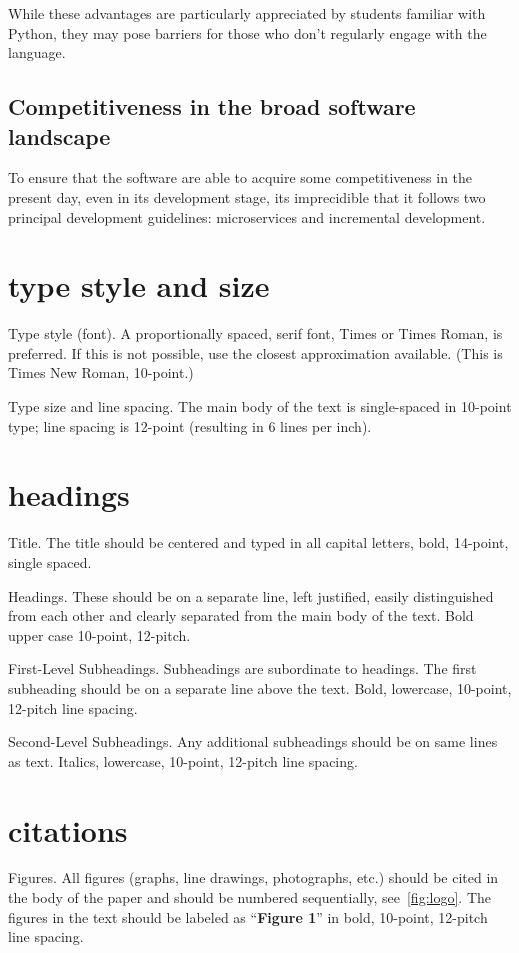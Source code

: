 \documentclass[10pt,twocolumn,twoside]{article}
\begin{document}
While these advantages are particularly appreciated by students familiar with Python, they may pose barriers for those who don't regularly engage with the language.

\subsection{Competitiveness in the broad software landscape}

To ensure that the software are able to acquire some competitiveness in the present day, even in its development stage, its imprecidible that it follows two principal development guidelines: microservices and incremental development.

\section{type style and size}
Type style (font). A proportionally spaced, serif font, Times or Times Roman, is preferred. If this is not possible, use the closest approximation available. (This is Times New Roman, 10-point.)

Type size and line spacing. The main body of the text is single-spaced in 10-point type; line spacing is 12-point (resulting in 6 lines per inch).

\section{headings}

Title. The title should be centered and typed in all capital letters, bold, 14-point, single spaced.

Headings. These should be on a separate line, left justified, easily distinguished from each other and clearly separated from the main body of the text. Bold upper case 10-point, 12-pitch.

First-Level Subheadings. Subheadings are subordinate to headings. The first subheading should be on a separate line above the text. Bold, lowercase, 10-point, 12-pitch line spacing.

Second-Level Subheadings. Any additional subheadings should be on same lines as text. Italics, lowercase, 10-point, 12-pitch line spacing.

\section{citations}

Figures. All figures (graphs, line drawings, photographs, etc.) should be cited in the body of the paper and should be numbered sequentially, see~\cref{fig:logo}. The figures in the text should be labeled as “\textbf{Figure 1}” in bold, 10-point, 12-pitch line spacing.
\end{document}

